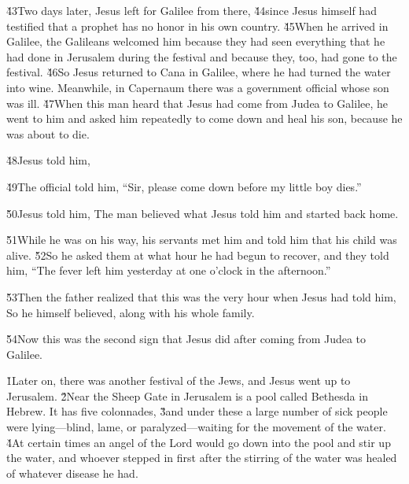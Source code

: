 \v{43}Two days later, Jesus left for Galilee from there, \v{44}since Jesus himself had testified that a prophet has no honor in his own country. \v{45}When he arrived in Galilee, the Galileans welcomed him because they had seen everything that he had done in Jerusalem during the festival and because they, too, had gone to the festival. \v{46}So Jesus returned to Cana in Galilee, where he had turned the water into wine. Meanwhile, in Capernaum there was a government official whose son was ill. \v{47}When this man heard that Jesus had come from Judea to Galilee, he went to him and asked him repeatedly to come down and heal his son, because he was about to die.

\v{48}Jesus told him,  

\v{49}The official told him, ``Sir, please come down before my little boy dies.''

\v{50}Jesus told him,  The man believed what Jesus told him and started back home.

\v{51}While he was on his way, his servants met him and told him that his child was alive. \v{52}So he asked them at what hour he had begun to recover, and they told him, ``The fever left him yesterday at one o'clock in the afternoon.''

\v{53}Then the father realized that this was the very hour when Jesus had told him,  So he himself believed, along with his whole family.

\v{54}Now this was the second sign that Jesus did after coming from Judea to Galilee.

\v{1}Later on, there was another festival of the Jews, and Jesus went up to Jerusalem. \v{2}Near the Sheep Gate in Jerusalem is a pool called Bethesda in Hebrew. It has five colonnades, \v{3}and under these a large number of sick people were lying---blind, lame, or paralyzed---waiting for the movement of the water. \v{4}At certain times an angel of the Lord would go down into the pool and stir up the water, and whoever stepped in first after the stirring of the water was healed of whatever disease he had.

